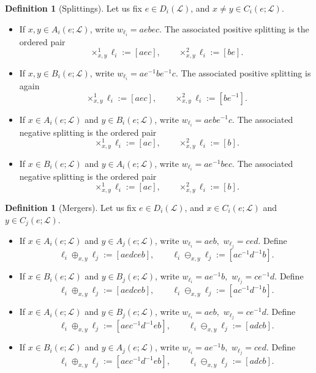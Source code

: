 \documentclass[11pt,a4paper,reqno]{article}
\theoremstyle{definition}
\newtheorem{definition}[theorem]{Definition}
\theoremstyle{remark}
\newcommand\Lc{{\mathcal{L}}}
\begin{document}
\begin{definition}[Splittings]
Let us fix $e\in D_i(\Lc)$, and
$x\neq y\in C_i(e;\Lc)$.

\begin{itemize}
\item If $x,y\in A_i(e;\Lc)$, write $w_{\ell_i}=aebec.$ The associated positive splitting is the ordered pair
\[
\times^1_{x,y}\ell_i:=[aec], \qquad \times^2_{x,y}\ell_i:=[be].
\]

\item If $x,y\in B_i(e;\Lc)$, write $w_{\ell_i}=ae^{-1}be^{-1}c.$ The associated positive splitting is again
\[
\times^1_{x,y}\ell_i:=[aec],\qquad \times^2_{x,y}\ell_i:=[be^{-1}].
\]

\item If $x\in A_i(e;\Lc)$ and $y\in B_i(e;\Lc)$, write $w_{\ell_i}=aebe^{-1}c.$ The associated negative splitting is the ordered pair
\[
\times^1_{x,y}\ell_i:=[ac], \qquad \times^2_{x,y}\ell_i:=[b].
\]

\item If $x\in B_i(e;\Lc)$ and $y\in A_i(e;\Lc)$, write $w_{\ell_i}=ae^{-1}bec.$ The associated negative splitting is the ordered pair
\[
\times^1_{x,y}\ell_i:=[ac],\qquad \times^2_{x,y}\ell_i:=[b].
\]
\end{itemize}
\end{definition}



\begin{definition}[Mergers]
Let us fix $e\in D_i(\Lc)$, and
$x\in C_i(e;\Lc)$ and $y\in C_j(e;\Lc)$.

\begin{itemize}
\item If $x\in A_i(e;\Lc)$ and $y\in A_j(e;\Lc)$, write $w_{\ell_i}=aeb,$ $w_{\ell_j}=ced.$
Define
\[
\ell_i\oplus_{x,y}\ell_j:=[aedceb],\qquad \ell_i\ominus_{x,y}\ell_j:=[ac^{-1}d^{-1}b].
\]
\item If $x\in B_i(e;\Lc)$ and $y\in B_j(e;\Lc)$, write $w_{\ell_i}=ae^{-1}b,$  $w_{\ell_j}=ce^{-1}d.$
Define
\[
\ell_i\oplus_{x,y}\ell_j:=[aedceb],\qquad \ell_i\ominus_{x,y}\ell_j:=[ac^{-1}d^{-1}b].
\]

\item If $x\in A_i(e;\Lc)$ and $y\in B_j(e;\Lc)$, write $w_{\ell_i}=aeb,$ $w_{\ell_j}=ce^{-1}d.$
Define
\[
\ell_i\oplus_{x,y}\ell_j:=[aec^{-1}d^{-1}eb], \qquad \ell_i\ominus_{x,y}\ell_j:=[adcb].
\]

\item If $x\in B_i(e;\Lc)$ and $y\in A_j(e;\Lc)$, write $w_{\ell_i}=ae^{-1}b,$ $w_{\ell_j}=ced.$
Define
\[
\ell_i\oplus_{x,y}\ell_j:=[aec^{-1}d^{-1}eb],\qquad \ell_i\ominus_{x,y}\ell_j:=[adcb].
\]
\end{itemize}
\end{definition}
\end{document}

